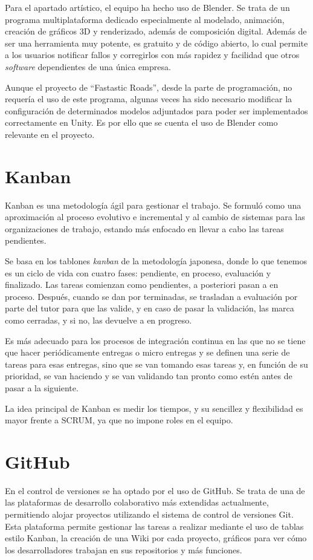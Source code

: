 Para el apartado artístico, el equipo ha hecho uso de Blender. Se trata de un programa multiplataforma dedicado especialmente al modelado, animación, creación de gráficos 3D y renderizado, además de composición digital. Además de ser una herramienta muy potente, es gratuito y de código abierto, lo cual permite a los usuarios notificar fallos y corregirlos con más rapidez y facilidad que otros \textit{software} dependientes de una única empresa.

Aunque el proyecto de ``Fastastic Roads'', desde la parte de programación, no requería el uso de este programa, algunas veces ha sido necesario modificar la configuración de determinados modelos adjuntados para poder ser implementados correctamente en Unity. Es por ello que se cuenta el uso de Blender como relevante en el proyecto.

\section{Kanban}

Kanban es una metodología ágil para gestionar el trabajo. Se formuló como una aproximación al proceso evolutivo e incremental y al cambio de sistemas para las organizaciones de trabajo, estando más enfocado en llevar a cabo las tareas pendientes. 

Se basa en los tablones \textit{kanban} de la metodología japonesa, donde lo que tenemos es un ciclo de vida con cuatro fases: pendiente, en proceso, evaluación y finalizado. Las tareas comienzan como pendientes, a posteriori pasan a en proceso. Después, cuando se dan por terminadas, se trasladan a evaluación por parte del tutor para que las valide, y en caso de pasar la validación, las marca como cerradas, y si no, las devuelve a en progreso. 

Es más adecuado para los procesos de integración continua en las que no se tiene que hacer periódicamente entregas o micro entregas y se definen una serie de tareas para esas entregas, sino que se van tomando esas tareas y, en función de su prioridad, se van haciendo y se van validando tan pronto como estén antes de pasar a la siguiente. 

La idea principal de Kanban es medir los tiempos, y su sencillez y flexibilidad es mayor frente a SCRUM, ya que no impone roles en el equipo.

\section{GitHub}

En el control de versiones se ha optado por el uso de GitHub. Se trata de una de las plataformas de desarrollo colaborativo más extendidas actualmente, permitiendo alojar proyectos utilizando el sistema de control de versiones Git. Esta plataforma permite gestionar las tareas a realizar mediante el uso de tablas estilo Kanban, la creación de una Wiki por cada proyecto, gráficos para ver cómo los desarrolladores trabajan en sus repositorios y más funciones.